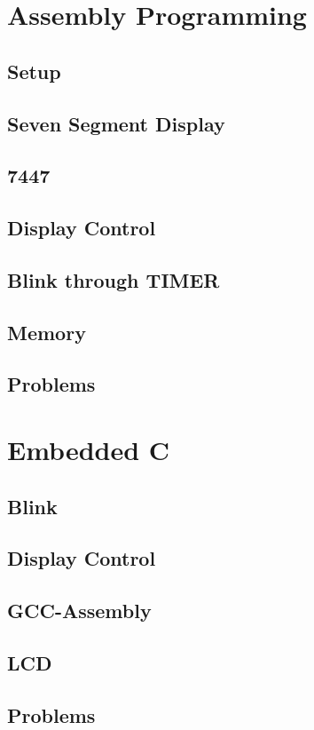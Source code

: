 \documentclass[journal]{IEEEtran}
\begin{document}
\section{Assembly Programming}
\subsection{Setup}

\subsection{Seven Segment Display}

\subsection{7447}

\subsection{Display Control}

\subsection{Blink through TIMER}

\subsection{Memory}

\subsection{Problems}

\newpage
\section{Embedded C}
\subsection{Blink}

\subsection{Display Control}

\subsection{GCC-Assembly}

\subsection{LCD}

\subsection{Problems}

\end{document}
